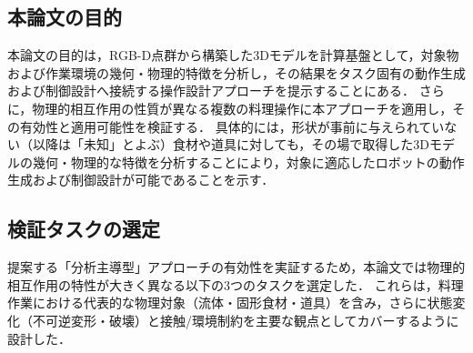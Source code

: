 \subsection{本論文の目的}

本論文の目的は，RGB-D点群から構築した3Dモデルを計算基盤として，対象物および作業環境の幾何・物理的特徴を分析し，その結果をタスク固有の動作生成および制御設計へ接続する操作設計アプローチを提示することにある．
さらに，物理的相互作用の性質が異なる複数の料理操作に本アプローチを適用し，その有効性と適用可能性を検証する．
具体的には，形状が事前に与えられていない（以降は「未知」とよぶ）食材や道具に対しても，その場で取得した3Dモデルの幾何・物理的な特徴を分析することにより，対象に適応したロボットの動作生成および制御設計が可能であることを示す．

\subsection{検証タスクの選定}

提案する「分析主導型」アプローチの有効性を実証するため，本論文では物理的相互作用の特性が大きく異なる以下の3つのタスクを選定した．
これらは，料理作業における代表的な物理対象（流体・固形食材・道具）を含み，さらに状態変化（不可逆変形・破壊）と接触/環境制約を主要な観点としてカバーするように設計した．

